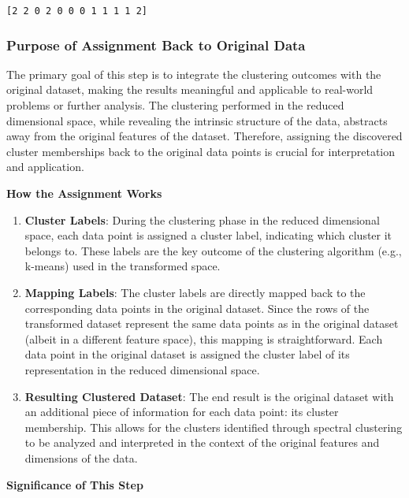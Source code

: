 \documentclass[11pt]{article}
\begin{document}
    \begin{Verbatim}[commandchars=\\\{\}]
[2 2 0 2 0 0 0 1 1 1 1 2]
    \end{Verbatim}

    \subsubsection{Purpose of Assignment Back to Original
Data}\label{purpose-of-assignment-back-to-original-data}

The primary goal of this step is to integrate the clustering outcomes
with the original dataset, making the results meaningful and applicable
to real-world problems or further analysis. The clustering performed in
the reduced dimensional space, while revealing the intrinsic structure
of the data, abstracts away from the original features of the dataset.
Therefore, assigning the discovered cluster memberships back to the
original data points is crucial for interpretation and application.

    \textbf{How the Assignment Works}

\begin{enumerate}
\def\labelenumi{\arabic{enumi}.}
\item
  \textbf{Cluster Labels}: During the clustering phase in the reduced
  dimensional space, each data point is assigned a cluster label,
  indicating which cluster it belongs to. These labels are the key
  outcome of the clustering algorithm (e.g., k-means) used in the
  transformed space.
\item
  \textbf{Mapping Labels}: The cluster labels are directly mapped back
  to the corresponding data points in the original dataset. Since the
  rows of the transformed dataset represent the same data points as in
  the original dataset (albeit in a different feature space), this
  mapping is straightforward. Each data point in the original dataset is
  assigned the cluster label of its representation in the reduced
  dimensional space.
\item
  \textbf{Resulting Clustered Dataset}: The end result is the original
  dataset with an additional piece of information for each data point:
  its cluster membership. This allows for the clusters identified
  through spectral clustering to be analyzed and interpreted in the
  context of the original features and dimensions of the data.
\end{enumerate}

    \textbf{Significance of This Step}
\end{document}
